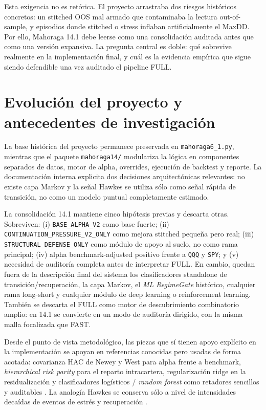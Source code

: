 \documentclass[11pt]{article}
\begin{document}
Esta exigencia no es ret\'orica. El proyecto arrastraba dos riesgos hist\'oricos concretos: un stitched OOS mal armado que contaminaba la lectura out-of-sample, y episodios donde stitched o stress inflaban artificialmente el MaxDD. Por ello, Mahoraga 14.1 debe leerse como una consolidaci\'on auditada antes que como una versi\'on expansiva. La pregunta central es doble: qu\'e sobrevive realmente en la implementaci\'on final, y cu\'al es la evidencia emp\'irica que sigue siendo defendible una vez auditado el pipeline FULL.

\section{Evoluci\'on del proyecto y antecedentes de investigaci\'on}
La base hist\'orica del proyecto permanece preservada en \texttt{mahoraga6\_1.py}, mientras que el paquete \texttt{mahoraga14/} modulariza la l\'ogica en componentes separados de datos, motor de alpha, overrides, ejecuci\'on de backtest y reporte. La documentaci\'on interna explicita dos decisiones arquitect\'onicas relevantes: no existe capa Markov y la se\~nal Hawkes se utiliza s\'olo como se\~nal r\'apida de transici\'on, no como un modelo puntual completamente estimado.

La consolidaci\'on 14.1 mantiene cinco hip\'otesis previas y descarta otras. Sobreviven: (i) \texttt{BASE\_ALPHA\_V2} como base fuerte; (ii) \texttt{CONTINUATION\_PRESSURE\_V2\_ONLY} como mejora stitched peque\~na pero real; (iii) \texttt{STRUCTURAL\_DEFENSE\_ONLY} como m\'odulo de apoyo al suelo, no como rama principal; (iv) alpha benchmark-adjusted positivo frente a \texttt{QQQ} y \texttt{SPY}; y (v) necesidad de auditor\'ia completa antes de interpretar FULL. En cambio, quedan fuera de la descripci\'on final del sistema los clasificadores standalone de transici\'on/recuperaci\'on, la capa Markov, el \textit{ML RegimeGate} hist\'orico, cualquier rama long-short y cualquier m\'odulo de deep learning o reinforcement learning. Tambi\'en se descarta el FULL como motor de descubrimiento combinatorio amplio: en 14.1 se convierte en un modo de auditor\'ia dirigido, con la misma malla focalizada que FAST.

Desde el punto de vista metodol\'ogico, las piezas que s\'i tienen apoyo expl\'icito en la implementaci\'on se apoyan en referencias conocidas pero usadas de forma acotada: covarianza HAC de Newey y West para alpha frente a benchmark, \textit{hierarchical risk parity} para el reparto intracartera, regularizaci\'on ridge en la residualizaci\'on y clasificadores log\'isticos / \textit{random forest} como retadores sencillos y auditables \cite{NeweyWest1987, LopezdePrado2016, HoerlKennard1970, Breiman2001}. La analog\'ia Hawkes se conserva s\'olo a nivel de intensidades deca\'idas de eventos de estr\'es y recuperaci\'on \cite{Hawkes1971}.
\end{document}
